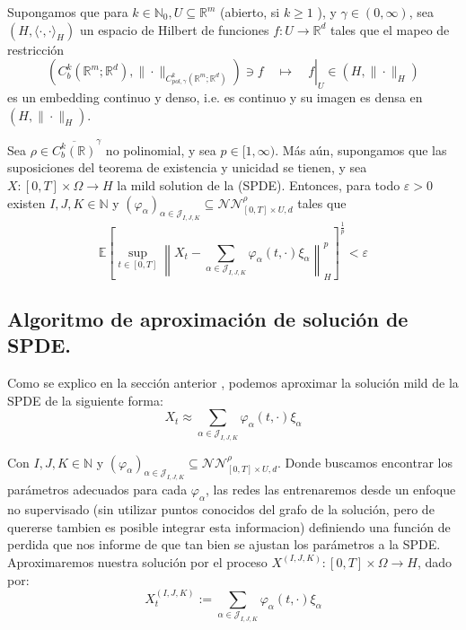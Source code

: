 \begin{teo}[]
  Supongamos que para $k \in \mathbb{N}_0, U \subseteq \mathbb{R}^m$ (abierto, si $k \geqslant 1$ ), y $\gamma \in(0, \infty)$, sea $\left(H,\langle\cdot, \cdot\rangle_H\right)$ un espacio de Hilbert de funciones $f: U \rightarrow \mathbb{R}^d$ tales que el mapeo de restricción
  $$
  \left.\left(C_b^k\left(\mathbb{R}^m ; \mathbb{R}^d\right),\|\cdot\|_{C_{p o l, \gamma}^k\left(\mathbb{R}^m ; \mathbb{R}^d\right)}\right) \ni f \quad \mapsto \quad f\right|_U \in\left(H,\|\cdot\|_H\right)
  $$
  es un embedding continuo y denso, i.e. es continuo y su imagen es densa en $\left(H,\|\cdot\|_H\right)$.

  Sea $\rho \in{\overline{C_b^k(\mathbb{R})}}^\gamma$ no polinomial, y sea $p \in[1, \infty)$. Más aún, supongamos que las suposiciones del teorema de existencia y unicidad se tienen, y sea $X:[0, T] \times \Omega \rightarrow H$ la mild solution de la (SPDE). Entonces, para todo $\varepsilon>0$ existen $I, J, K \in \mathbb{N}$ y $\left(\varphi_\alpha\right)_{\alpha \in \mathcal{J}_{I, J, K}} \subseteq \mathcal{N} \mathcal{N}_{[0, T] \times U, d}^\rho$ tales que
  $$
  \mathbb{E}\left[\sup _{t \in[0, T]}\left\|X_t-\sum_{\alpha \in \mathcal{J}_{I, J, K}} \varphi_\alpha(t, \cdot) \xi_\alpha\right\|_H^p\right]^{\frac{1}{p}}<\varepsilon
  $$
\end{teo}

\subsection{Algoritmo de aproximación de solución de SPDE.}

Como se explico en la sección anterior , podemos aproximar la solución mild de la SPDE de la siguiente forma:
\[X_t \approx \sum_{\alpha \in \mathcal{J}_{I, J, K}} \varphi_\alpha(t, \cdot) \xi_\alpha\]

Con $I, J, K \in \mathbb{N}$ y $\left(\varphi_\alpha\right)_{\alpha \in \mathcal{J}_{I, J, K}} \subseteq \mathcal{N} \mathcal{N}_{[0, T] \times U, d}^\rho$. Donde buscamos encontrar los parámetros adecuados para cada $\varphi_\alpha$, las redes las entrenaremos desde un enfoque no supervisado (sin utilizar puntos conocidos del grafo de la solución, pero de quererse tambien es posible integrar esta informacion) definiendo una función de perdida que nos informe de que tan bien se ajustan los parámetros a la SPDE. Aproximaremos nuestra solución por el proceso $X^{(I,J,K)}: [0,T] \times \Omega \rightarrow H$, dado por:
\[X_t^{(I,J,K)} := \sum_{\alpha \in \mathcal{J}_{I, J, K}} \varphi_\alpha(t, \cdot) \xi_\alpha\]

